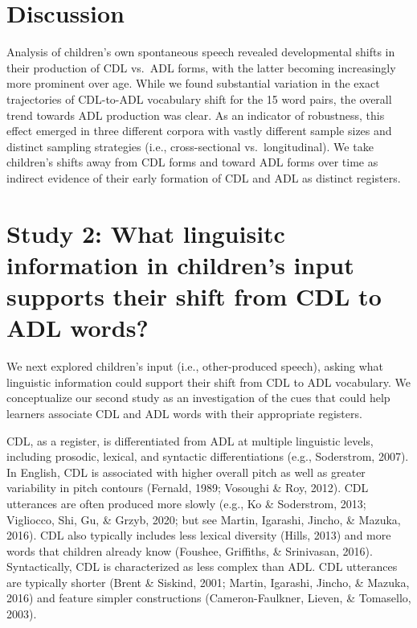 \documentclass[10pt, letterpaper]{article}
\begin{document}
\hypertarget{discussion}{%
\section{Discussion}\label{discussion}}

Analysis of children's own spontaneous speech revealed developmental
shifts in their production of CDL vs.~ADL forms, with the latter
becoming increasingly more prominent over age. While we found
substantial variation in the exact trajectories of CDL-to-ADL vocabulary
shift for the 15 word pairs, the overall trend towards ADL production
was clear. As an indicator of robustness, this effect emerged in three
different corpora with vastly different sample sizes and distinct
sampling strategies (i.e., cross-sectional vs.~longitudinal). We take
children's shifts away from CDL forms and toward ADL forms over time as
indirect evidence of their early formation of CDL and ADL as distinct
registers.

\hypertarget{study-2-what-linguisitc-information-in-childrens-input-supports-their-shift-from-cdl-to-adl-words}{%
\section{Study 2: What linguisitc information in children's input
supports their shift from CDL to ADL
words?}\label{study-2-what-linguisitc-information-in-childrens-input-supports-their-shift-from-cdl-to-adl-words}}

We next explored children's input (i.e., other-produced speech), asking
what linguistic information could support their shift from CDL to ADL
vocabulary. We conceptualize our second study as an investigation of the
cues that could help learners associate CDL and ADL words with their
appropriate registers.

CDL, as a register, is differentiated from ADL at multiple linguistic
levels, including prosodic, lexical, and syntactic differentiations
(e.g., Soderstrom, 2007). In English, CDL is associated with higher
overall pitch as well as greater variability in pitch contours (Fernald,
1989; Vosoughi \& Roy, 2012). CDL utterances are often produced more
slowly (e.g., Ko \& Soderstrom, 2013; Vigliocco, Shi, Gu, \& Grzyb,
2020; but see Martin, Igarashi, Jincho, \& Mazuka, 2016). CDL also
typically includes less lexical diversity (Hills, 2013) and more words
that children already know (Foushee, Griffiths, \& Srinivasan, 2016).
Syntactically, CDL is characterized as less complex than ADL. CDL
utterances are typically shorter (Brent \& Siskind, 2001; Martin,
Igarashi, Jincho, \& Mazuka, 2016) and feature simpler constructions
(Cameron-Faulkner, Lieven, \& Tomasello, 2003).
\end{document}
